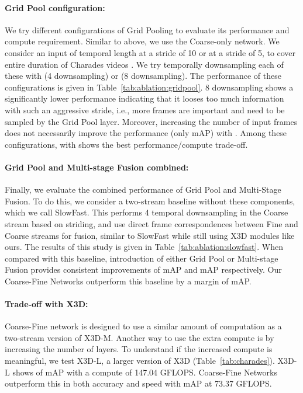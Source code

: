 \documentclass[final]{cvpr}
\newcommand{\tref}[1]{Table~\ref{#1}}
\begin{document}
\vspace{-3pt}
\paragraph{Grid Pool configuration:} We try different configurations of Grid Pooling to evaluate its performance and compute requirement. Similar to above, we use the Coarse-only network. We consider an input of temporal length   at a stride of 10 or  at a stride of 5, to cover entire duration of Charades videos \cite{sigurdsson2016hollywood}. We try temporally downsampling each of these with  (4 downsampling) or  (8 downsampling). The performance of these configurations is given in \tref{tab:ablation:gridpool}. 8 downsampling shows a significantly lower performance indicating that it looses too much information with such an aggressive stride, i.e., more frames are important and need to be sampled by the Grid Pool layer. Moreover, increasing the number of input frames does not necessarily improve the performance (only  mAP) with . Among these configurations,  with  shows the best performance/compute trade-off.

\vspace{-3pt}
\paragraph{Grid Pool and Multi-stage Fusion combined:} Finally, we evaluate the combined performance of Grid Pool and Multi-Stage Fusion. To do this, we consider a two-stream baseline without these components, which we call SlowFast. This performs 4 temporal downsampling in the Coarse stream based on striding, and use direct frame correspondences between Fine and Coarse streams for fusion, similar to SlowFast \cite{feichtenhofer2019slowfast} 
while still using X3D modules like ours. The results of this study is given in \tref{tab:ablation:slowfast}. When compared with this baseline, introduction of either Grid Pool or Multi-stage Fusion provides consistent improvements of  mAP and  mAP respectively. Our Coarse-Fine Networks outperform this baseline by a margin of  mAP.

\vspace{-3pt}
\paragraph{Trade-off with X3D:} Coarse-Fine network is designed to use a similar amount of computation as a two-stream version of X3D-M. Another way to use the extra compute is by increasing the number of layers. To understand if the increased compute is meaningful, we test X3D-L, a larger version of X3D (\tref{tab:charades}). X3D-L shows of  mAP with a compute of 147.04 GFLOPS. Coarse-Fine Networks outperform this in both accuracy and speed with  mAP at 73.37 GFLOPS.
\end{document}
